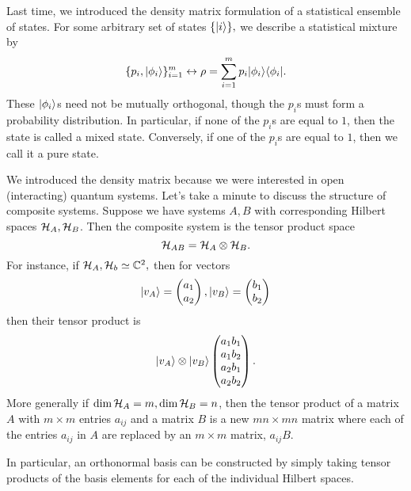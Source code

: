 Last time, we introduced the density matrix formulation of a statistical ensemble of states. For some arbitrary set of states $\{\lvert i\rangle\},$ we describe a statistical mixture by
\begin{equation}
    \{p_i,\lvert\phi_i\rangle\}_{i=1}^m \leftrightarrow \rho =\sum_{i=1}^m p_i \lvert\phi_i\rangle\langle\phi_i\rvert.
\end{equation}
These $\lvert\phi_i\rangle$s need not be mutually orthogonal, though the $p_i$s must form a probability distribution. In particular, if none of the $p_i$s are equal to $1$, then the state is called a mixed state. Conversely, if one of the $p_i$s are equal to $1$, then we call it a pure state.

We introduced the density matrix because we were interested in open (interacting) quantum systems. Let's take a minute to discuss the structure of composite systems. Suppose we have systems $A,B$ with corresponding Hilbert spaces $\mathcal H_A,\mathcal H_B$. Then the composite system is the tensor product space
\begin{equation}
    \mathcal H_{AB}=\mathcal H_{A} \otimes \mathcal H_B.
\end{equation}
For instance, if $\mathcal H_A,\mathcal H_b \simeq \mathbb{C}^2,$ then for vectors
\begin{equation*}
    \lvert v_A\rangle=\begin{pmatrix} a_1 \\ a_2
    \end{pmatrix},
    \lvert v_B\rangle=\begin{pmatrix} b_1 \\ b_2
    \end{pmatrix}
\end{equation*}
then their tensor product is
\begin{equation*}
    \lvert v_A\rangle\otimes \lvert v_B\rangle \begin{pmatrix} a_1b_1 \\ a_1 b_2 \\ a_2b_1 \\ a_2b_2
    \end{pmatrix}.
\end{equation*}
%
More generally if $\dim \mathcal H_A =m, \dim\mathcal H_B=n$, then the tensor product of a matrix $A$ with $m\times m$ entries $a_{ij}$ and a matrix $B$ is a new $mn\times mn$ matrix where each of the entries $a_{ij}$ in $A$ are replaced by an $m\times m$ matrix, $a_{ij} B$.

In particular, an orthonormal basis can be constructed by simply taking tensor products of the basis elements for each of the individual Hilbert spaces.

